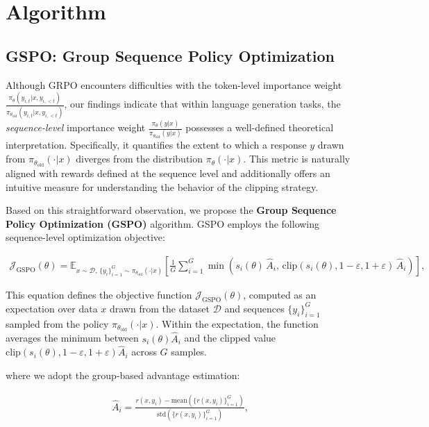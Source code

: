 \section{Algorithm}

\subsection{GSPO: Group Sequence Policy Optimization}

Although GRPO encounters difficulties with the token-level importance weight $\frac{ \pi_{\theta} (y_{i,t} | x, y_{i,<t}) }{ \pi_{\theta_\text{old}} (y_{i,t} | x,y_{i,<t})}$, our findings indicate that within language generation tasks, the \textit{sequence-level} importance weight $\frac{ \pi_{\theta} (y | x) }{ \pi_{\theta_\text{old}} (y | x)}$ possesses a well-defined theoretical interpretation. Specifically, it quantifies the extent to which a response $y$ drawn from $\pi_{\theta_\text{old}} (\cdot | x)$ diverges from the distribution $\pi_{\theta} (\cdot | x)$. This metric is naturally aligned with rewards defined at the sequence level and additionally offers an intuitive measure for understanding the behavior of the clipping strategy.

Based on this straightforward observation, we propose the \textbf{Group Sequence Policy Optimization (GSPO)} algorithm. GSPO employs the following sequence-level optimization objective:

\begin{align}
\mathcal{J}_\text{GSPO} (\theta) = 
\mathbb{E}_{ x \sim \mathcal{D},\, \{y_i\}_{i=1}^G \sim \pi_{\theta_\text{old}}( \cdot | x) }
\left[
\frac{1}{G} \sum_{i=1}^{G}
\min \left( s_{i}(\theta)\,\widehat{A}_{i},\, \mathrm{clip}\left( s_{i}(\theta), 1-{\varepsilon}, 1+{\varepsilon} \right)\,\widehat{A}_{i} \right)
\right],
\label{equ:gspo}
\end{align}

This equation defines the objective function $\mathcal{J}_\text{GSPO} (\theta)$, computed as an expectation over data $x$ drawn from the dataset $\mathcal{D}$ and sequences $\{y_i\}_{i=1}^G$ sampled from the policy $\pi_{\theta_\text{old}}(\cdot|x)$. Within the expectation, the function averages the minimum between $s_{i}(\theta) \widehat{A}_{i}$ and the clipped value $\mathrm{clip}( s_{i}(\theta), 1-{\varepsilon}, 1+{\varepsilon}) \widehat{A}_{i}$ across $G$ samples.

where we adopt the group-based advantage estimation:

\begin{align}
\widehat{A}_{i} = \frac{r(x, y_i) - \mathrm{mean} \left( \{ r(x, y_i) \}_{i=1}^G \right) }{ \mathrm{std} \left( \{ r(x, y_i) \}_{i=1}^G \right) },
\end{align}

